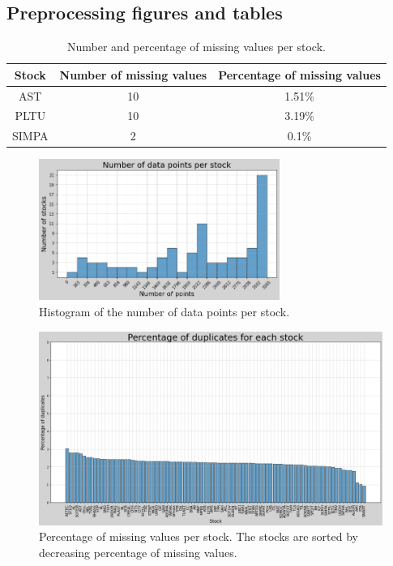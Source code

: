 \documentclass[11pt]{article}
\begin{document}
\subsection{Preprocessing figures and tables}

\begin{table}[H]
    \centering
    \begin{tabular}{|c|c|c|}
        \hline
        Stock & Number of missing values & Percentage of missing values \\
        \hline
        AST   & 10                       & 1.51\%                       \\
        PLTU  & 10                       & 3.19\%                       \\
        SIMPA & 2                        & 0.1\%                        \\
        \hline
    \end{tabular}
    \caption{Number and percentage of missing values per stock.}
    \label{tab:missing_values}
\end{table}

\begin{figure}[H]
    \centering
    \includegraphics[width=0.7\textwidth]{figures/preprocessing/histogram_size.png}
    \caption{Histogram of the number of data points per stock.}
    \label{fig:histogram_size}
\end{figure}

\begin{figure}[H]
    \centering
    \begin{minipage}[t]{0.75\textwidth}
        \includegraphics[width=\textwidth]{figures/preprocessing/bar_duplicates.png}
        \caption{Percentage of missing values per stock. The stocks are sorted by decreasing percentage of missing values.}
        \label{fig:bar_duplicates}
    \end{minipage}
\end{figure}
\end{document}
